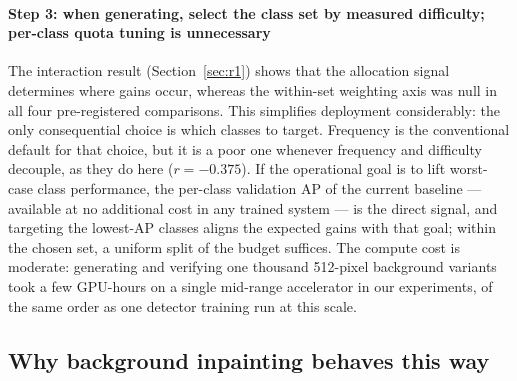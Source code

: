 \documentclass[preprint,12pt,authoryear]{elsarticle}
\begin{document}
\paragraph{Step 3: when generating, select the class set by measured
difficulty; per-class quota tuning is unnecessary}
The interaction result (Section~\ref{sec:r1}) shows that the allocation
signal determines where gains occur, whereas the within-set weighting
axis was null in all four pre-registered comparisons. This simplifies
deployment considerably: the only consequential choice is which classes
to target. Frequency is the conventional default for that choice, but it
is a poor one whenever frequency and difficulty decouple, as they do
here ($r = -0.375$). If the operational goal is to lift worst-case class
performance, the per-class validation AP of the current baseline ---
available at no additional cost in any trained system --- is the direct
signal, and targeting the lowest-AP classes aligns the expected gains
with that goal; within the chosen set, a uniform split of the budget
suffices. The compute cost is moderate: generating and verifying one
thousand 512-pixel background variants took a few GPU-hours on a single
mid-range accelerator in our experiments, of the same order as one
detector training run at this scale.

\subsection{Why background inpainting behaves this way}
\end{document}
